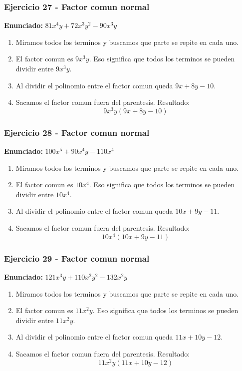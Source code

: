 \documentclass[11pt,a4paper]{article}
\begin{document}
\vspace{0.2cm}
\subsubsection*{Ejercicio 27 - Factor comun normal}
\textbf{Enunciado:} $ 81 x^{4} y + 72 x^{3} y^{2} - 90 x^{3} y $\par
\begin{enumerate}[leftmargin=2em]
\item Miramos todos los terminos y buscamos que parte se repite en cada uno.
\item El factor comun es \(9 x^{3} y\). Eso significa que todos los terminos se pueden dividir entre \(9 x^{3} y\).
\item Al dividir el polinomio entre el factor comun queda \(9 x + 8 y - 10\).
\item Sacamos el factor comun fuera del parentesis. Resultado: \[\boxed{9 x^{3} y\left(9 x + 8 y - 10\right)}\]
\end{enumerate}

\vspace{0.2cm}
\subsubsection*{Ejercicio 28 - Factor comun normal}
\textbf{Enunciado:} $ 100 x^{5} + 90 x^{4} y - 110 x^{4} $\par
\begin{enumerate}[leftmargin=2em]
\item Miramos todos los terminos y buscamos que parte se repite en cada uno.
\item El factor comun es \(10 x^{4}\). Eso significa que todos los terminos se pueden dividir entre \(10 x^{4}\).
\item Al dividir el polinomio entre el factor comun queda \(10 x + 9 y - 11\).
\item Sacamos el factor comun fuera del parentesis. Resultado: \[\boxed{10 x^{4}\left(10 x + 9 y - 11\right)}\]
\end{enumerate}

\vspace{0.2cm}
\subsubsection*{Ejercicio 29 - Factor comun normal}
\textbf{Enunciado:} $ 121 x^{3} y + 110 x^{2} y^{2} - 132 x^{2} y $\par
\begin{enumerate}[leftmargin=2em]
\item Miramos todos los terminos y buscamos que parte se repite en cada uno.
\item El factor comun es \(11 x^{2} y\). Eso significa que todos los terminos se pueden dividir entre \(11 x^{2} y\).
\item Al dividir el polinomio entre el factor comun queda \(11 x + 10 y - 12\).
\item Sacamos el factor comun fuera del parentesis. Resultado: \[\boxed{11 x^{2} y\left(11 x + 10 y - 12\right)}\]
\end{enumerate}
\end{document}
